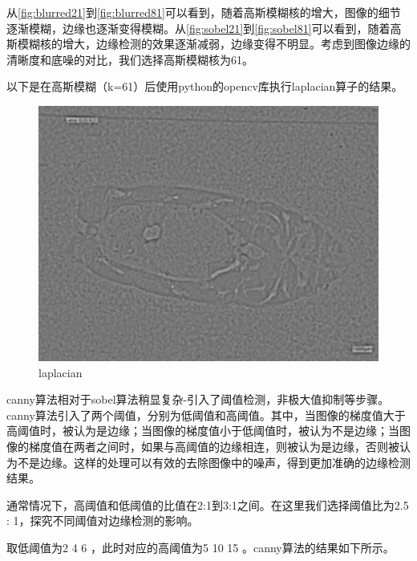 从\autoref{fig:blurred21}到\autoref{fig:blurred81}可以看到，随着高斯模糊核的增大，图像的细节逐渐模糊，边缘也逐渐变得模糊。从\autoref{fig:sobel21}到\autoref{fig:sobel81}可以看到，随着高斯模糊核的增大，边缘检测的效果逐渐减弱，边缘变得不明显。考虑到图像边缘的清晰度和底噪的对比，我们选择高斯模糊核为61。


以下是在高斯模糊（k=61）后使用python的opencv库执行laplacian算子的结果。

\begin{figure}[H]
    \centering
    \begin{minipage}{0.45\textwidth}
        \centering
        \includegraphics[width=\textwidth]{./fig/gausssian/laplacian61.jpg}
        \caption{laplacian}
        \label{fig:laplacian}
    \end{minipage}
\end{figure}

canny算法相对于sobel算法稍显复杂-引入了阈值检测，非极大值抑制等步骤。canny算法引入了两个阈值，分别为低阈值和高阈值。其中，当图像的梯度值大于高阈值时，被认为是边缘；当图像的梯度值小于低阈值时，被认为不是边缘；当图像的梯度值在两者之间时，如果与高阈值的边缘相连，则被认为是边缘，否则被认为不是边缘。这样的处理可以有效的去除图像中的噪声，得到更加准确的边缘检测结果。

通常情况下，高阈值和低阈值的比值在2:1到3:1之间。在这里我们选择阈值比为2.5 : 1，探究不同阈值对边缘检测的影响。

取低阈值为2 4 6 ，此时对应的高阈值为5 10 15 。canny算法的结果如下所示。

